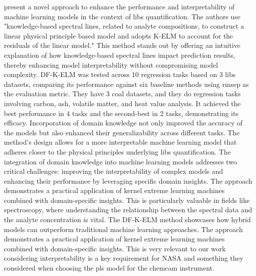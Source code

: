 \citet{song_DF-K-ELM} present a novel approach to enhance the performance and interpretability of machine learning models in the context of \gls{libs} quantification.
The authors use "knowledge-based spectral lines, related to analyte compositions, to construct a linear physical principle based model and adopts K-ELM to account for the residuals of the linear model."
This method stands out by offering an intuitive explanation of how knowledge-based spectral lines impact prediction results, thereby enhancing model interpretability without compromising model complexity.
DF-K-ELM was tested across 10 regression tasks based on 3 \gls{libs} datasets, comparing its performance against six baseline methods using \gls{rmsep} as the evaluation metric.
They have 3 coal datasets, and they do regression tasks involving carbon, ash, volatile matter, and heat value analysis.
It achieved the best performance in 4 tasks and the second-best in 2 tasks, demonstrating its efficacy.
Incorporation of domain knowledge not only improved the accuracy of the models but also enhanced their generalizability across different tasks.
The method's design allows for a more interpretable machine learning model that adheres closer to the physical principles underlying \gls{libs} quantification.
The integration of domain knowledge into machine learning models addresses two critical challenges: improving the interpretability of complex models and enhancing their performance by leveraging specific domain insights.
The approach demonstrates a practical application of kernel extreme learning machines combined with domain-specific insights.
This is particularly valuable in fields like spectroscopy, where understanding the relationship between the spectral data and the analyte concentration is vital.
The DF-K-ELM method showcases how hybrid models can outperform traditional machine learning approaches.
The approach demonstrates a practical application of kernel extreme learning machines combined with domain-specific insights.
This is very relevant to our work considering interpretability is a key requirement for NASA and something they considered when choosing the \gls{pls} model for the \gls{chemcam} instrument.

